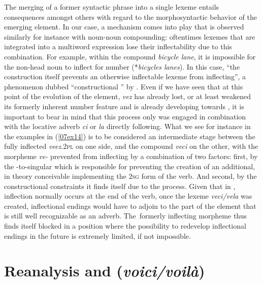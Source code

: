 \documentclass[output=paper,colorlinks,citecolor=brown]{langscibook}
\begin{document}
The merging of a former syntactic phrase into a single lexeme entails consequences amongst others with regard to the morphosyntactic behavior of the emerging element. In our case, a mechanism comes into play that is observed similarly for instance with noun-noun compounding: oftentimes lexemes that are integrated into a multiword expression lose their inflectability due to this combination. For example, within the  compound \emph{bicycle lane}, it is impossible for the non-head noun to inflect for  number (*\emph{bicycles lanes}). In this case, ``the construction itself prevents an otherwise inflectable lexeme from inflecting'', a phenomenon dubbed ``constructional '' by \citet[148]{spencer2020}. Even if we have seen that at this point of the evolution of the  element, \emph{vez} has already lost, or at least weakened its formerly inherent number feature and is already developing towards , it is important to bear in mind that this process only was engaged in combination with the locative adverb \emph{ci} or \emph{la} directly following. What we see for instance in the examples in (\ref{07ex14}) is to be considered an intermediate stage between the fully inflected \emph{veez}.\textsc{2pl} on one side, and the compound \emph{veci} on the other, with the morpheme \emph{ve-} prevented from inflecting by a combination of two factors: first, by the -to-singular  which is responsible for preventing the creation of an additional, in theory conceivable  implementing the \textsc{2sg} form of the verb. And second, by the constructional constraints it finds itself due to the  process. Given that in , inflection normally occurs at the end of the verb, once the lexeme \emph{veci/vela} was created, inflectional endings would have to adjoin to the part of the element that is still well recognizable as an adverb. The~formerly inflecting morpheme thus finds itself blocked in a position where the possibility to redevelop inflectional endings in the future is extremely limited, if not impossible.

\section{Reanalysis and  (\emph{voici/voilà})} \label{07sec5}
\end{document}
